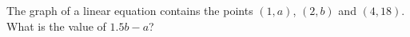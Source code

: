 The graph of a linear equation contains the points $(1,a)$, $(2,b)$ and $(4,18)$. What is the value of $1.5b-a$?
